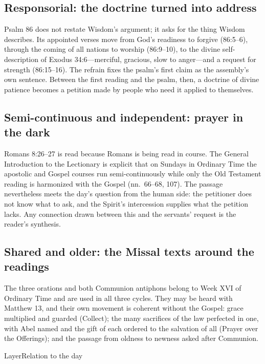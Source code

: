 \subsection*{Responsorial: the doctrine turned into address}

Psalm 86 does not restate Wisdom's argument; it asks for the thing Wisdom
describes. Its appointed verses move from God's readiness to forgive
(86:5--6), through the coming of all nations to worship (86:9--10), to the
divine self-description of Exodus 34:6---merciful, gracious, slow to
anger---and a request for strength (86:15--16). The refrain fixes the psalm's
first claim as the assembly's own sentence. Between the first reading and the
psalm, then, a doctrine of divine patience becomes a petition made by people
who need it applied to themselves.

\subsection*{Semi-continuous and independent: prayer in the dark}

Romans 8:26--27 is read because Romans is being read in course. The General
Introduction to the Lectionary is
explicit that on Sundays in Ordinary Time the apostolic and Gospel courses run
semi-continuously while only the Old Testament reading is harmonized with the
Gospel (nn.\ 66--68, 107). The passage nevertheless meets the day's question
from the human side: the petitioner does not know what to ask, and the
Spirit's intercession supplies what the petition lacks. Any connection drawn
between this and the servants' request is the reader's synthesis.

\subsection*{Shared and older: the Missal texts around the readings}

The three orations and both Communion antiphons belong to Week XVI of Ordinary
Time and are used in all three cycles. They may be heard with Matthew 13, and
their own movement is coherent without the Gospel:
grace multiplied and guarded (Collect); the many sacrifices of the law
perfected in one, with Abel named and the gift of each ordered to the
salvation of all (Prayer over the Offerings); and the passage from oldness to
newness asked after Communion.

\begin{twocoltable}{Layer}{Relation to the day}
\end{twocoltable}

